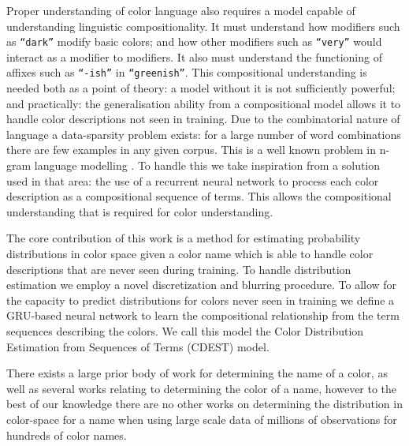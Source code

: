 \documentclass[11pt,letterpaper, twocolumn]{article}
\newcommand{\parencite}{\citep}
\begin{document}
Proper understanding of color language also requires a model capable of understanding linguistic compositionality.
It must understand how modifiers such as \texttt{``dark''} modify basic colors; and  how other modifiers such as \texttt{``very''} would interact as a modifier to modifiers.
It also must understand the functioning of affixes such as \texttt{``-ish''} in \texttt{``greenish''}.
This compositional understanding is needed both as a point of theory: a model without it is not sufficiently powerful; and practically: the generalisation ability from a compositional model allows it to handle color descriptions not seen in training.
Due to the combinatorial nature of language a data-sparsity problem exists:
for a large number of word combinations there are few examples in any given corpus.
This is a well known problem in n-gram language modelling \parencite{kneser1995improved,chen1996empirical,rosenfeld2000two}.
To handle this we take inspiration from a solution used in that area: the use of a recurrent neural network \parencite{mikolov2010recurrent,mikolov2011RnnLM} to process each color description as a compositional sequence of terms.
This allows the compositional understanding that is required for color understanding.


The core contribution of this work is a method for estimating probability distributions in color space given a color name which is able to handle color descriptions that are never seen during training.
To handle distribution estimation we employ a novel discretization and blurring procedure.
To allow for the capacity to predict distributions for colors never seen in training we define a GRU-based neural network to learn the compositional relationship from the term sequences describing the colors.
We call this model the Color Distribution Estimation from Sequences of Terms (CDEST) model.

There exists a large prior body of work for determining the name of a color, as well as several works relating to determining the color of a name, however to the best of our knowledge there are no other works on determining the distribution in color-space for a name when using large scale data of millions of observations for hundreds of color names.
\end{document}
